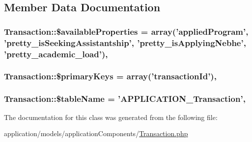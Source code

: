 \subsection{Member Data Documentation}
\hypertarget{class_transaction_a71d322ec3be0e210bfe2922c2e498ee8}{
\subsubsection[{\$available\-Properties}]{\setlength{\rightskip}{0pt plus 5cm}Transaction\-::\$available\-Properties = array('applied\-Program', 'pretty\-\_\-is\-Seeking\-Assistantship', 'pretty\-\_\-is\-Applying\-Nebhe', 'pretty\-\_\-academic\-\_\-load')\hspace{0.3cm}{\ttfamily [static]}, {\ttfamily [protected]}}}\label{class_transaction_a71d322ec3be0e210bfe2922c2e498ee8}
\hypertarget{class_transaction_a9ab0151d5dd1ef33b5486c2340d0af16}{
\subsubsection[{\$primary\-Keys}]{\setlength{\rightskip}{0pt plus 5cm}Transaction\-::\$primary\-Keys = array('transaction\-Id')\hspace{0.3cm}{\ttfamily [static]}, {\ttfamily [protected]}}}\label{class_transaction_a9ab0151d5dd1ef33b5486c2340d0af16}
\hypertarget{class_transaction_a1e7fee8d4d26108b4e1a33478af9135b}{
\subsubsection[{\$table\-Name}]{\setlength{\rightskip}{0pt plus 5cm}Transaction\-::\$table\-Name = 'A\-P\-P\-L\-I\-C\-A\-T\-I\-O\-N\-\_\-\-Transaction'\hspace{0.3cm}{\ttfamily [static]}, {\ttfamily [protected]}}}\label{class_transaction_a1e7fee8d4d26108b4e1a33478af9135b}


The documentation for this class was generated from the following file\-:\begin{DoxyCompactItemize}
\item 
application/models/application\-Components/\hyperlink{_transaction_8php}{Transaction.\-php}\end{DoxyCompactItemize}
